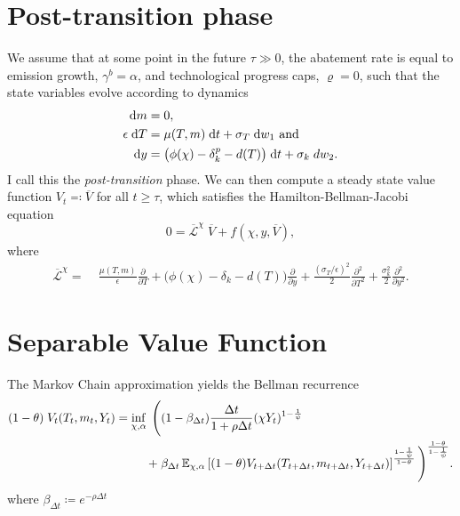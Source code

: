 \documentclass[../../main.tex]{subfiles}
\begin{document}
\section{Post-transition phase}

We assume that at some point in the future $\tau \gg 0$, the abatement rate is equal to emission growth, $\gamma^b = \alpha$, and technological progress caps, $\varrho = 0$, such that the state variables evolve according to dynamics \begin{align}
    \mathrm{d}m &= 0, \\
    \epsilon \; \mathrm{d}T &= \mu(T, m) \; \mathrm{d}t + \sigma_T \; \mathrm{d}w_1 \text{ and } \\
    \mathrm{d}y &= \big( \phi(\chi) - \delta_k^p - d(T) \big) \; \mathrm{d}t + \sigma_k \; d w_2.
\end{align} I call this the \textit{post-transition} phase. We can then compute a steady state value function $V_t \eqqcolon \overline{V}$ for all $t \geq \tau$, which satisfies the Hamilton-Bellman-Jacobi equation \begin{equation}
    0 = \overline{\mathcal{L}}^\chi \; \overline{V} + f(\chi, y, \overline{V}),
\end{equation} where \begin{equation}
    \begin{split}
        \overline{\mathcal{L}}^\chi = \; &\frac{\mu(T, m)}{\epsilon} \frac{\partial}{\partial T} + \Big(\phi(\chi) - \delta_k - d(T) \Big) \frac{\partial}{\partial y} + \frac{(\sigma_T / \epsilon)^2}{2} \frac{\partial^2}{\partial T^2} + \frac{\sigma^2_k}{2} \frac{\partial^2}{\partial y^2}.
    \end{split}
\end{equation}

\section{Separable Value Function}

The Markov Chain approximation yields the Bellman recurrence \begin{equation}
    \begin{split}
        (1 - \theta) \; V_{t}(T_t, m_t, Y_t) = \inf_{\chi, \alpha} \; \Bigg(&(1 - \beta_{\Delta t} )\frac{\Delta t}{1 + \rho \Delta t}  (\chi Y_t)^{1 - \frac{1}{\psi}} \\
        + \; &\beta_{\Delta t}  \operatorname{\mathbb{E}}_{\chi, \alpha} \left[(1 - \theta)V_{t + \Delta t}(T_{t + \Delta t}, m_{t + \Delta t}, Y_{t + \Delta t})  \right]^{\frac{1 - \frac{1}{\psi}}{1 - \theta}} \Bigg)^{\frac{1 - \theta}{1 - \frac{1}{\psi}}}.
    \end{split}
\end{equation} where $\beta_{\Delta t} \coloneqq e^{-\rho \Delta t}$%
\end{document}
